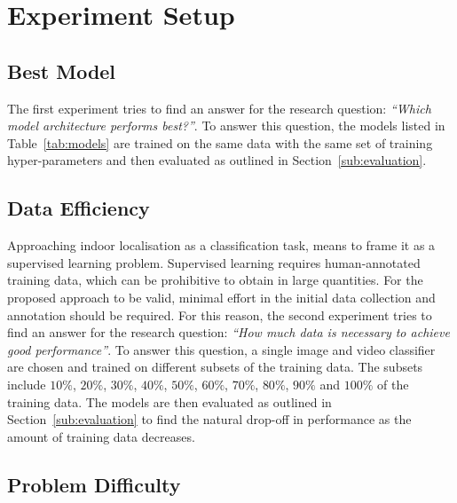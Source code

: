 \documentclass[a4paper]{article}
\begin{document}


  \section{Experiment Setup} %
  \label{sec:experiment-setup}

  \subsection{Best Model} %
  \label{sub:best-odel}

  The first experiment tries to find an answer for the research question:
  \textit{ ``Which model architecture performs best?''}. To answer this
  question, the models listed in Table~\ref{tab:models} are trained on the
  same data with the same set of training hyper-parameters and then evaluated
  as outlined in Section~\ref{sub:evaluation}.


  \subsection{Data Efficiency} %
  \label{sub:data-efficiency}

  Approaching indoor localisation as a classification task, means to frame it as
  a supervised learning problem. Supervised learning requires human-annotated
  training data, which can be prohibitive to obtain in large quantities. For the
  proposed approach to be valid, minimal effort in the initial data collection
  and annotation should be required. For this reason, the second experiment
  tries to find an answer for the research question: \textit{ ``How much data
  is necessary to achieve good performance''}. To answer this question, a single
  image and video classifier are chosen and trained on different subsets of the 
  training data. The subsets include $10\%$, $20\%$, $30\%$, $40\%$, $50\%$,
  $60\%$, $70\%$, $80\%$, $90\%$ and $100\%$ of the training data. The models 
  are then evaluated as outlined in Section~\ref{sub:evaluation} to find the
  natural drop-off in performance as the amount of training data decreases.


  \subsection{Problem Difficulty} %
  \label{sub:problem-difficulty}
\end{document}
